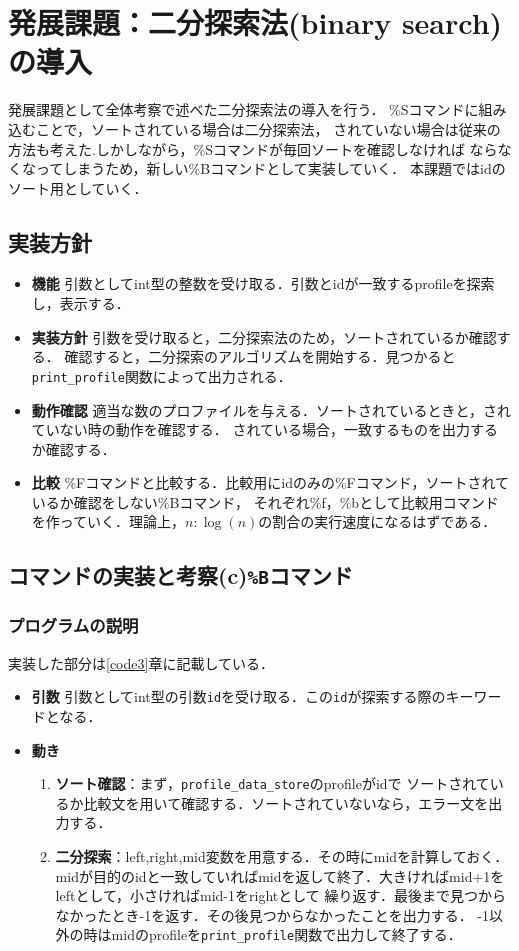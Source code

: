 \section{発展課題：二分探索法(binary search)の導入}
発展課題として全体考察で述べた二分探索法の導入を行う．
\%Sコマンドに組み込むことで，ソートされている場合は二分探索法，
されていない場合は従来の方法も考えた.しかしながら，\%Sコマンドが毎回ソートを確認しなければ
ならなくなってしまうため，新しい\%Bコマンドとして実装していく．
本課題ではidのソート用としていく．
\subsection{実装方針}
\begin{itemize}
  \item \textbf{機能} 引数としてint型の整数を受け取る．引数とidが一致するprofileを探索し，表示する．
  \item \textbf{実装方針} 引数を受け取ると，二分探索法のため，ソートされているか確認する．
  確認すると，二分探索のアルゴリズムを開始する．見つかると\texttt{print\_profile}関数によって出力される．
  \item \textbf{動作確認} 適当な数のプロファイルを与える．ソートされているときと，されていない時の動作を確認する．
  されている場合，一致するものを出力するか確認する．
  \item \textbf{比較} \%Fコマンドと比較する．比較用にidのみの\%Fコマンド，ソートされているか確認をしない\%Bコマンド，
  それぞれ\%f，\%bとして比較用コマンドを作っていく．理論上，$n : \log(n)$の割合の実行速度になるはずである．
\end{itemize}
\subsection{コマンドの実装と考察(c)\texttt{\%B}コマンド}

  \subsubsection{プログラムの説明}
  実装した部分は\ref{code3}章に記載している．
      \begin{itemize}
        \item \textbf{引数} 引数としてint型の引数\texttt{id}を受け取る．この\texttt{id}が探索する際のキーワードとなる．
        \item \textbf{動き}
        \begin{enumerate}
          \item \textbf{ソート確認}：まず，\texttt{profile\_data\_store}のprofileがidで
          ソートされているか比較文を用いて確認する．ソートされていないなら，エラー文を出力する．
          \item \textbf{二分探索}：left,right,mid変数を用意する．その時にmidを計算しておく．
          midが目的のidと一致していればmidを返して終了．大きければmid+1をleftとして，小さければmid-1をrightとして
          繰り返す．最後まで見つからなかったとき-1を返す．その後見つからなかったことを出力する．
          -1以外の時はmidのprofileを\texttt{print\_profile}関数で出力して終了する．
        \end{enumerate}
      \end{itemize}
      

